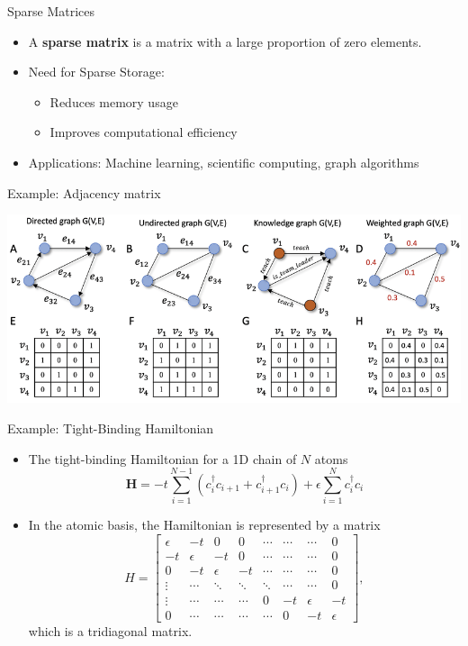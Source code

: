 \documentclass{beamer}
\begin{document}
\begin{frame}{Sparse Matrices}
    \begin{itemize}
        \item A \textbf{sparse matrix} is a matrix with a large proportion of zero elements.
        \item Need for Sparse Storage:
        \begin{itemize}
        \item Reduces memory usage
        \item Improves computational efficiency
        \end{itemize}
        \item Applications: Machine learning, scientific computing, graph algorithms
    \end{itemize}
\end{frame}
\begin{frame}{Example: Adjacency matrix}
\centerline{\includegraphics[width=\textwidth]{Different-types-of-graphs-and-their-corresponding-adjacency-matrix-representations-The.ppm.png}}
\end{frame}
\begin{frame}{Example: Tight-Binding Hamiltonian}
    \begin{itemize}
        \item The tight-binding Hamiltonian for a 1D chain of $N$ atoms 
        \[
        \mathbf{H}=-t \sum_{i=1}^{N-1} \left({c}_i^{\dagger} {c}_{i+1}+{c}_{i+1}^{\dagger} {c}_i\right)+
        \epsilon \sum_{i=1}^N {c}_i^{\dagger} {c}_i
        \]
        \item In the atomic basis, the Hamiltonian is represented by a matrix
        \[  
        H=\left[\begin{array}{llllllll}
        \epsilon & -t & 0 & 0 & \cdots & \cdots & \cdots & 0 \\
        -t & \epsilon & -t & 0 & \cdots & \cdots & \cdots & 0\\
        0 & -t & \epsilon & -t & \cdots & \cdots & \cdots & 0  \\
        \vdots & \cdots & \ddots & \ddots & \ddots & \cdots & \cdots &  0 \\
        \vdots & \cdots &  \cdots & \cdots & 0 & -t & \epsilon & -t \\
        0 & \cdots& \cdots & \cdots & \cdots &  0 & -t & \epsilon   
        \end{array}\right],
        \]
        which is a tridiagonal matrix.
    \end{itemize}
\end{frame}
\end{document}
